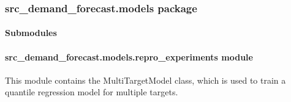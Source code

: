 \documentclass[letterpaper,10pt,english]{sphinxmanual}
\begin{document}
\subsubsection{src\_demand\_forecast.models package}
\label{\detokenize{src_demand_forecast.models:src-demand-forecast-models-package}}\label{\detokenize{src_demand_forecast.models::doc}}

\paragraph{Submodules}
\label{\detokenize{src_demand_forecast.models:submodules}}

\paragraph{src\_demand\_forecast.models.repro\_experiments module}
\label{\detokenize{src_demand_forecast.models:module-src_demand_forecast.models.repro_experiments}}\label{\detokenize{src_demand_forecast.models:src-demand-forecast-models-repro-experiments-module}}
\sphinxAtStartPar
This module contains the MultiTargetModel class, which is used to train a quantile regression model
for multiple targets.
\end{document}
